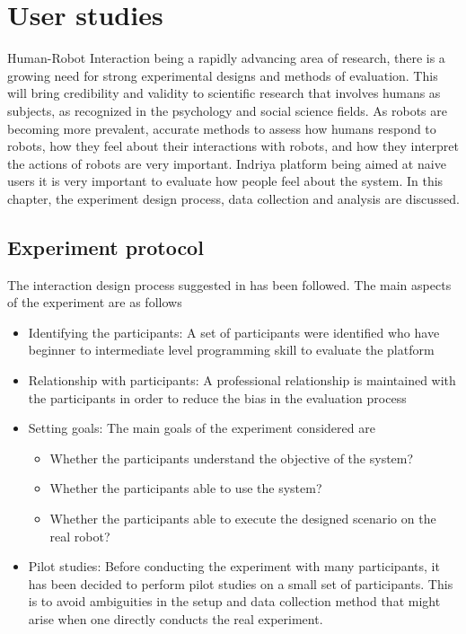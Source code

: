 
\chapter{User studies} %

\label{Chapter6} %

Human-Robot Interaction being a rapidly advancing area of research, there is a growing need for strong experimental designs and methods of evaluation. This will bring credibility and validity to scientific research that involves humans as subjects, as recognized in the psychology and social science fields. As robots are becoming more prevalent, accurate methods to assess how humans respond to robots, how they feel about their interactions with robots, and how they interpret the actions of robots are very important. Indriya platform being aimed at naive users it is very important to evaluate how people feel about the system. In this chapter, the experiment design process, data collection and analysis are discussed.

\section{Experiment protocol}
The interaction design process suggested in \cite{Rogers2011} has been followed. The main aspects of the experiment are as follows
\begin{itemize}
\item Identifying the participants: A set of participants were identified who have beginner to intermediate level programming skill to evaluate the platform
\item Relationship with participants: A professional relationship is maintained with the participants in order to reduce the bias in the evaluation process
\item Setting goals: The main goals of the experiment considered are
\begin{itemize}
\item Whether the participants understand the objective of the system?
\item Whether the participants able to use the system?
\item Whether the participants able to execute the designed scenario on the real robot?
\end{itemize}
\item Pilot studies: Before conducting the experiment with many participants, it has been decided to perform pilot studies on a small set of participants. This is to avoid ambiguities in the setup and data collection method that might arise when one directly conducts the real experiment.
\end{itemize}

